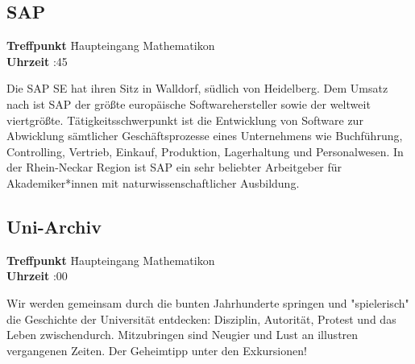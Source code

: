 \subsection*{SAP}
\begin{tabbing}
\textbf{Treffpunkt} \quad \quad \quad \= Haupteingang Mathematikon\\
\textbf{Uhrzeit} :45
\end{tabbing}
Die SAP SE hat ihren Sitz in Walldorf, südlich von Heidelberg. Dem Umsatz nach ist SAP der größte europäische Softwarehersteller sowie der weltweit viertgrößte. Tätigkeitsschwerpunkt ist die Entwicklung von Software zur Abwicklung sämtlicher Geschäftsprozesse eines Unternehmens wie Buchführung, Controlling, Vertrieb, Einkauf, Produktion, Lagerhaltung und Personalwesen. In der Rhein-Neckar Region ist SAP ein sehr beliebter Arbeitgeber für Akademiker*innen mit naturwissenschaftlicher Ausbildung. 

\subsection*{Uni-Archiv}
\begin{tabbing}
\textbf{Treffpunkt} \quad \quad \quad \= Haupteingang Mathematikon\\
\textbf{Uhrzeit} :00
\end{tabbing}
Wir werden gemeinsam durch die bunten Jahrhunderte springen und "spielerisch" die Geschichte der Universität entdecken: Disziplin, Autorität, Protest und das Leben zwischendurch. Mitzubringen sind Neugier und Lust an illustren vergangenen Zeiten. Der Geheimtipp unter den Exkursionen! 

